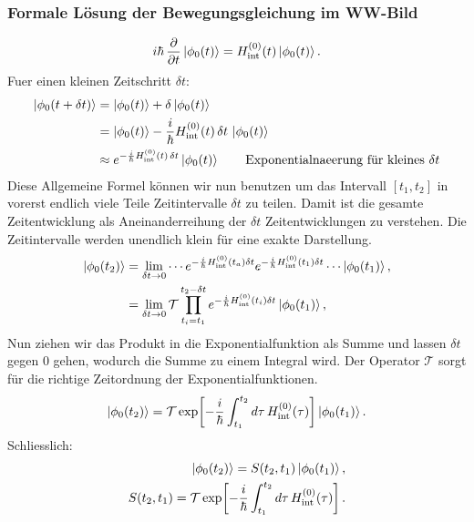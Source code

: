 \subsubsection*{Formale Lösung der Bewegungsgleichung im WW-Bild}
\begin{equation}
  \label{eq:ww-eom}
  i\hbar\,\frac{\partial}{\partial t}\left|\phi_0(t)\right\rangle
  =H_{\mathrm{int}}^{(0)}(t)\left|\phi_0(t)\right\rangle.
\end{equation}
Fuer einen kleinen Zeitschritt $\delta t$:
\begin{equation}
  \begin{aligned}
    \left|\phi_0(t+\delta t)\right\rangle & = \left|\phi_0(t)\right\rangle+\delta\left|\phi_0(t)\right\rangle                                              \\
                             & =\left|\phi_0(t)\right\rangle-\frac{i}{\hbar}H_{\mathrm{int}}^{(0)}(t)\,\delta t\,\left|\phi_0(t)\right\rangle \\
                             & \approx e^{-\frac{i}{\hbar}H_{\mathrm{int}}^{(0)}(t)\,\delta t}\left|\phi_0(t)\right\rangle
    \qquad \text{Exponentialnaeerung für kleines }\delta t
  \end{aligned}
\end{equation}
Diese Allgemeine Formel können wir nun benutzen um das Intervall $[t_1,t_2]$ in vorerst endlich viele Teile Zeitintervalle $\delta t$ zu teilen.
Damit ist die gesamte Zeitentwicklung als Aneinanderreihung der $\delta t$ Zeitentwicklungen zu verstehen.
Die Zeitintervalle werden unendlich klein für eine exakte Darstellung.
\begin{equation}
  \begin{aligned}
    \left|\phi_0(t_2)\right\rangle
     & = \lim \limits_{\delta t \to 0}\cdots e^{-\frac{i}{\hbar}H_{\mathrm{int}}^{(0)}(t_{a})\delta t}e^{-\frac{i}{\hbar}H_{\mathrm{int}}^{(0)}(t_1)\delta t}\cdots\left|\phi_0(t_1)\right\rangle, \\
     & =\lim \limits_{\delta t \to 0}\mathcal T\prod_{t_i=t_1}^{t_2-\delta t}e^{-\frac{i}{\hbar}H_{\mathrm{int}}^{(0)}(t_i)\delta t}\left|\phi_0(t_1)\right\rangle,
  \end{aligned}
\end{equation}
Nun ziehen wir das Produkt in die Exponentialfunktion als Summe und lassen $\delta t$ gegen 0 gehen, wodurch die Summe zu einem Integral wird.
Der Operator $\mathcal{T}$ sorgt für die richtige Zeitordnung der Exponentialfunktionen.
\begin{equation}
  \left|\phi_0(t_2)\right\rangle
  =\mathcal T\exp\!\left[-\frac{i}{\hbar}\int_{t_1}^{t_2}d\tau\,H_{\mathrm{int}}^{(0)}(\tau)\right]\left|\phi_0(t_1)\right\rangle.
\end{equation}
Schliesslich:
\begin{equation}
  \begin{aligned}
    \left|\phi_0(t_2)\right\rangle=S(t_2,t_1)\left|\phi_0(t_1)\right\rangle, \\
    S(t_2,t_1)=\mathcal T\exp\!\left[-\frac{i}{\hbar}\int_{t_1}^{t_2}d\tau\,H_{\mathrm{int}}^{(0)}(\tau)\right].
  \end{aligned}
\end{equation}

